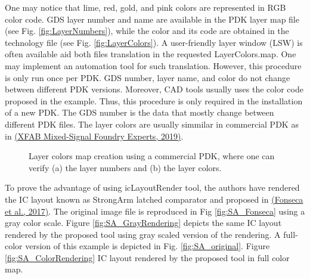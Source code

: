 \documentclass[10pt,a4paper,onecolumn]{article}
\begin{document}
One may notice that lime, red, gold, and pink colors are represented in
RGB color code. GDS layer number and name are available in the PDK layer
map file (see Fig. \ref{fig:LayerNumbers}), while the color and its code are obtained in
the technology file (see Fig. \ref{fig:LayerColors}). A user-friendly layer window (LSW)
is often available aid both files translation in the requested
LayerColors.map. One may implement an automation tool for such
translation. However, this procedure is only run once per PDK. GDS
number, layer name, and color do not change between different PDK
versions. Moreover, CAD tools usually uses the color code proposed in
the example. Thus, this procedure is only required in the installation
of a new PDK. The GDS number is the data that mostly change between
different PDK files. The layer colors are usually simmilar in commercial PDK as in \hyperlink{ref-XFAB2019}{(XFAB Mixed-Signal Foundry Experts, 2019)}.
\begin{figure}[ht]
 \begin{center}
   \caption{Layer colors map creation using a commercial PDK, where one can verify (a) the layer numbers and (b) the layer colors.}
 \end{center}
\end{figure}

To prove the advantage of using icLayoutRender tool, the authors have
rendered the IC layout known as StrongArm latched comparator and
proposed in \hyperlink{ref-Fonseca2017}{(Fonseca et al., 2017)}. The original image file is
reproduced in Fig \ref{fig:SA_Fonseca} using a gray color scale. Figure \ref{fig:SA_GrayRendering} depicts the
same IC layout rendered by the proposed tool using gray scaled version
of the rendering. A full-color version of this example is depicted in
Fig. \ref{fig:SA_original}. Figure \ref{fig:SA_ColorRendering} IC layout rendered by the proposed tool in full
color map.
\end{document}
